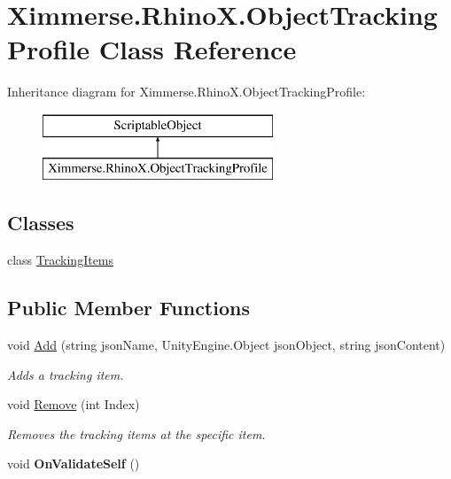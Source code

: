 \hypertarget{class_ximmerse_1_1_rhino_x_1_1_object_tracking_profile}{}\section{Ximmerse.\+Rhino\+X.\+Object\+Tracking\+Profile Class Reference}
\label{class_ximmerse_1_1_rhino_x_1_1_object_tracking_profile}
Inheritance diagram for Ximmerse.\+Rhino\+X.\+Object\+Tracking\+Profile\+:\begin{figure}[H]
\begin{center}
\leavevmode
\includegraphics[height=2.000000cm]{class_ximmerse_1_1_rhino_x_1_1_object_tracking_profile}
\end{center}
\end{figure}
\subsection*{Classes}
\begin{DoxyCompactItemize}
\item 
class \mbox{\hyperlink{class_ximmerse_1_1_rhino_x_1_1_object_tracking_profile_1_1_tracking_items}{Tracking\+Items}}
\end{DoxyCompactItemize}
\subsection*{Public Member Functions}
\begin{DoxyCompactItemize}
\item 
void \mbox{\hyperlink{class_ximmerse_1_1_rhino_x_1_1_object_tracking_profile_a73cba033e2017accd3f607514ccf5935}{Add}} (string json\+Name, Unity\+Engine.\+Object json\+Object, string json\+Content)
\begin{DoxyCompactList}\small\item\em Adds a tracking item. \end{DoxyCompactList}\item 
void \mbox{\hyperlink{class_ximmerse_1_1_rhino_x_1_1_object_tracking_profile_a7096567a6cc3599254f38f73aebc3b09}{Remove}} (int Index)
\begin{DoxyCompactList}\small\item\em Removes the tracking items at the specific item. \end{DoxyCompactList}\item 
\mbox{\label{class_ximmerse_1_1_rhino_x_1_1_object_tracking_profile_a1b298818407574a90fdd814b64a1108d}} 
void {\bfseries On\+Validate\+Self} ()
\end{DoxyCompactItemize}
